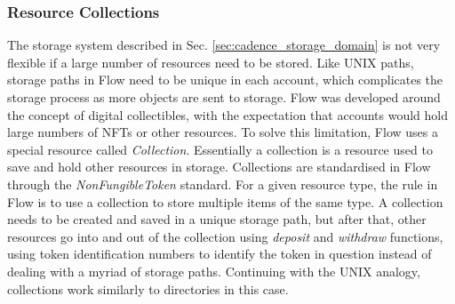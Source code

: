 \documentclass[../NFTComp_IEEE.tex]{subfiles}
\begin{document}
\subsubsection{Resource Collections}
\label{sec:resource_collections}
The storage system described in Sec. \ref{sec:cadence_storage_domain} is not very flexible if a large number of resources need to be stored. Like UNIX paths, storage paths in Flow need to be unique in each account, which complicates the storage process as more objects are sent to storage. Flow was developed around the concept of digital collectibles, with the expectation that accounts would hold large numbers of NFTs or other resources. To solve this limitation, Flow uses a special resource called \textit{Collection}. Essentially a collection is a resource used to save and hold other resources in storage. Collections are standardised in Flow through the \textit{NonFungibleToken} standard. For a given resource type, the rule in Flow is to use a collection to store multiple items of the same type. A collection needs to be created and saved in a unique storage path, but after that, other resources go into and out of the collection using \textit{deposit} and \textit{withdraw} functions, using token identification numbers to identify the token in question instead of dealing with a myriad of storage paths. Continuing with the UNIX analogy, collections work similarly to directories in this case.
\end{document}
